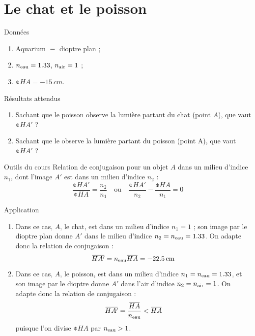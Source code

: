 \documentclass[10pt,a5paper,notitlepage]{book}
\begin{document}
\section{Le chat et le poisson}
\begin{NCdefi}{Données}
    \begin{enumerate}
        \item Aquarium $\equiv$ dioptre plan ;
        \item $n _{\text{eau}} = 1.33$, $n _{\text{air}} = 1$ ;
        \item $\obar{HA} = \SI{-15}{cm}$.
    \end{enumerate}
\end{NCdefi}

\begin{NCprop}{Résultats attendus}
    \begin{enumerate}
        \item Sachant que le poisson observe la lumière partant du chat (point
            $A$), que vaut $\obar{HA'}$ ?
        \item Sachant que le  observe la lumière partant du poisson
            (point A), que vaut $\obar{HA'}$ ?
    \end{enumerate}
\end{NCprop}

\begin{NCdemo}{Outils du cours}
    Relation de conjugaison pour un objet $A$ dans un milieu d'indice $n_1$,
    dont l'image $A'$ est dans un milieu d'indice $n_2$ :
    \[ \frac{\obar{HA'}}{\obar{HA}} = \frac{n_2}{n_1} \quad \mathrm{ou} \quad
    \frac{\obar{HA'}}{n_2} - \frac{\obar{HA}}{n_1} = 0 \]
\end{NCdemo}

\begin{NCexem}{Application}
    \begin{enumerate}
        \item Dans ce cas, $A$, le chat, est dans un milieu d'indice $n_1 = 1$ ;
            son image par le dioptre plan donne $A'$ dans le milieu d'indice
            $n_2 = n _{\text{eau}} = 1.33$. On adapte donc la relation de conjugaison
            :
        \[ \obar{HA'} = n \St{eau}\obar{HA} = \SI{-22.5}{cm}\]
        \item Dans ce cas, $A$, le poisson, est dans un milieu d'indice $n_1 = n
            _{\text{eau}} = 1.33$, et son image par le dioptre donne $A'$ dans l'air
            d'indice $n_2 = n _{\text{air}} = 1$. On adapte donc la relation de
            conjugaison :
            \[ \obar{HA'} = \frac{\obar{HA}}{n \St{eau}} < \obar{HA} \]
            puisque l'on divise $\obar{HA}$ par $n _{\text{eau}} > 1$.
    \end{enumerate}
\end{NCexem}
\end{document}
